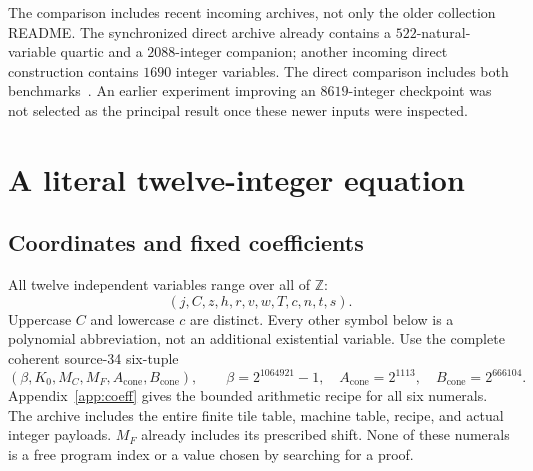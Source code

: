 \documentclass[11pt,a4paper]{article}
\theoremstyle{remark}\newtheorem{remark}[theorem]{Remark}
\newcommand{\Z}{\mathbb Z}\newcommand{\Q}{\mathbb Q}\newcommand{\N}{\mathbb N}
\newcommand{\Acone}{A_{\mathrm{cone}}}\newcommand{\Bcone}{B_{\mathrm{cone}}}
\begin{document}
The comparison includes recent incoming archives, not only the older
collection README. The synchronized direct archive already contains a
$522$-natural-variable quartic and a $2088$-integer companion; another
incoming direct construction contains $1690$ integer variables.
The direct comparison includes both benchmarks~\cite{sync,batched}.
An earlier experiment improving an $8619$-integer checkpoint was not
selected as the principal result once these newer inputs were inspected.

\section{A literal twelve-integer equation}\label{sec:equation}
\subsection{Coordinates and fixed coefficients}

All twelve independent variables range over all of $\Z$:
\[
 (j,C,z,h,r,v,w,T,c,n,t,s).
\]
Uppercase $C$ and lowercase $c$ are distinct. Every other symbol below is
a polynomial abbreviation, not an additional existential variable.
Use the complete coherent source-34 six-tuple
\[
 (\beta,K_0,M_C,M_F,\Acone,\Bcone),
 \qquad
 \beta=2^{1064921}-1,\quad
 \Acone=2^{1113},\quad\Bcone=2^{666104}.
\]
Appendix~\ref{app:coeff} gives the bounded arithmetic recipe for all six
numerals. The archive includes the entire finite tile table, machine table,
recipe, and actual integer payloads. $M_F$ already includes its prescribed
shift. None of these numerals is a free program index or a value chosen by
searching for a proof.
\end{document}
